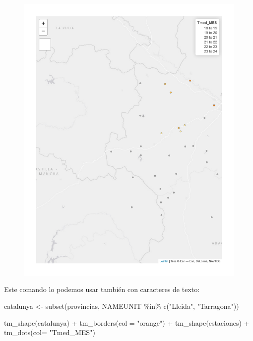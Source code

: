 \documentclass[
  letterpaper,
  DIV=11,
  numbers=noendperiod]{scrreprt}
\newenvironment{Shaded}{\begin{snugshade}}{\end{snugshade}}
\newcommand{\AttributeTok}[1]{\textcolor[rgb]{0.40,0.45,0.13}{#1}}
\newcommand{\FunctionTok}[1]{\textcolor[rgb]{0.28,0.35,0.67}{#1}}
\newcommand{\NormalTok}[1]{\textcolor[rgb]{0.00,0.23,0.31}{#1}}
\newcommand{\OtherTok}[1]{\textcolor[rgb]{0.00,0.23,0.31}{#1}}
\newcommand{\SpecialCharTok}[1]{\textcolor[rgb]{0.37,0.37,0.37}{#1}}
\newcommand{\StringTok}[1]{\textcolor[rgb]{0.13,0.47,0.30}{#1}}
\begin{document}
\begin{figure}[H]

{\centering \includegraphics{03_DatosEspaciales_files/figure-pdf/unnamed-chunk-20-1.pdf}

}

\end{figure}

Este comando lo podemos usar también con caracteres de texto:

\begin{Shaded}
\begin{Highlighting}[]
\NormalTok{catalunya }\OtherTok{\textless{}{-}} \FunctionTok{subset}\NormalTok{(provincias, NAMEUNIT }\SpecialCharTok{\%in\%} \FunctionTok{c}\NormalTok{(}\StringTok{"Lleida"}\NormalTok{, }\StringTok{"Tarragona"}\NormalTok{))}

\FunctionTok{tm\_shape}\NormalTok{(catalunya) }\SpecialCharTok{+}
    \FunctionTok{tm\_borders}\NormalTok{(}\AttributeTok{col =} \StringTok{"orange"}\NormalTok{) }\SpecialCharTok{+}
\FunctionTok{tm\_shape}\NormalTok{(estaciones) }\SpecialCharTok{+}
    \FunctionTok{tm\_dots}\NormalTok{(}\AttributeTok{col=} \StringTok{"Tmed\_MES"}\NormalTok{)}
\end{Highlighting}
\end{Shaded}
\end{document}
